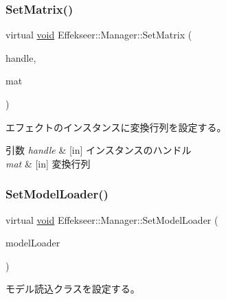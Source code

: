 \subsubsection{\texorpdfstring{Set\+Matrix()}{SetMatrix()}}
{\footnotesize\ttfamily virtual \mbox{\hyperlink{namespace_effekseer_ab34c4088e512200cf4c2716f168deb56}{void}} Effekseer\+::\+Manager\+::\+Set\+Matrix (\begin{DoxyParamCaption}\item[{\mbox{\hyperlink{namespace_effekseer_afba58b8d812da862190e9bbfc040824a}{Handle}}}]{handle,  }\item[{const \mbox{\hyperlink{struct_effekseer_1_1_matrix43}{Matrix43}} \&}]{mat }\end{DoxyParamCaption})\hspace{0.3cm}{\ttfamily [pure virtual]}}



エフェクトのインスタンスに変換行列を設定する。 


\begin{DoxyParams}{引数}
{\em handle} & \mbox{[}in\mbox{]} インスタンスのハンドル \\
\hline
{\em mat} & \mbox{[}in\mbox{]} 変換行列 \\
\hline
\end{DoxyParams}
\mbox{\label{class_effekseer_1_1_manager_a994104b9b353a09861d27ec87b09fa1c}} 
\subsubsection{\texorpdfstring{Set\+Model\+Loader()}{SetModelLoader()}}
{\footnotesize\ttfamily virtual \mbox{\hyperlink{namespace_effekseer_ab34c4088e512200cf4c2716f168deb56}{void}} Effekseer\+::\+Manager\+::\+Set\+Model\+Loader (\begin{DoxyParamCaption}\item[{\mbox{\hyperlink{class_effekseer_1_1_model_loader}{Model\+Loader}} $\ast$}]{model\+Loader }\end{DoxyParamCaption})\hspace{0.3cm}{\ttfamily [pure virtual]}}



モデル読込クラスを設定する。 

\mbox{\label{class_effekseer_1_1_manager_aa423ee424d0b713ac4939fc7faf39b9c}} 
